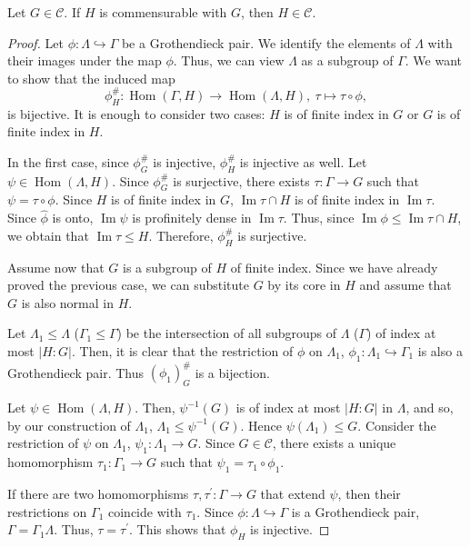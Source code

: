 \documentclass[10pt,a4paper]{amsart}
\DeclareMathOperator{\Hom}{Hom}
\DeclareMathOperator{\im}{Im}
\begin{document}
   \begin{pro}\label{gr1}
Let $G\in \mathcal C$. If $H$ is commensurable with $G$, then $H\in \mathcal C$.
\end{pro}

\begin{proof}
Let  $\phi:\Lambda \hookrightarrow \Gamma$ be a Grothendieck pair. We identify the elements of $\Lambda$ with their images under the map $\phi$. Thus, we can view $\Lambda$ as a subgroup of $\Gamma$.
 We want to show that the induced map 
$$ \phi^{\#}_H:\Hom (\Gamma, H)\to \Hom (\Lambda, H), \ \tau\mapsto \tau\circ \phi,$$  is bijective. It is enough to consider two cases: $H$ is of finite index in $G$ or $G$ is of finite index in $H$.

In the first case, since $\phi_G^{\#}$ is injective,  $\phi_H^{\#}$ is injective as well. Let $\psi\in \Hom (\Lambda, H)$. Since $\phi_G^{\#}$ is surjective, there exists $\tau: \Gamma\to G$ such that $\psi=\tau\circ \phi$. Since $H$ is of finite index in $G$, $\im \tau \cap H$ is of finite index in $\im \tau$. Since $\widehat \phi$ is onto, $\im \psi$ is profinitely dense in $\im \tau$. Thus, since $\im \phi\le \im \tau \cap H$,  we obtain that
$\im \tau\le H$. Therefore, $\phi_H^{\#}$ is surjective.

Assume now that $G$ is a subgroup of $H$ of finite index. Since we have already proved the previous case, we can substitute $G$ by its core in $H$ and  assume that $G$ is also normal in $H$.

Let $\Lambda_1\le \Lambda $ ($\Gamma_1\le \Gamma$) be the intersection of all subgroups of $\Lambda$ ($\Gamma$) of index at most $|H:G|$. Then, it is clear that the restriction of $\phi$ on $\Lambda_1$, $\phi_1:\Lambda_1 \hookrightarrow \Gamma_1$ is also a Grothendieck pair. Thus $(\phi_1)_G^{\#}$ is a bijection. 

Let $\psi\in \Hom(\Lambda, H)$. Then, $\psi^{-1}(G)$ is of index at most $|H:G|$ in $\Lambda$, and so,   by our construction of $\Lambda_1$, $\Lambda_1\le \psi^{-1}(G)$. Hence $\psi(\Lambda_1)\le G$.  Consider the restriction of $\psi$ on $\Lambda_1$, $\psi_1:\Lambda_1 \to  G$.  Since $G\in \mathcal C$, there exists a unique homomorphism $\tau_1:\Gamma_1\to G$ such that $\psi_1=\tau_1\circ \phi_1$.  

If there are two homomorphisms $\tau, \tau^\prime: \Gamma\to G$ that extend $\psi$, then their restrictions on $\Gamma_1$ coincide with $\tau_1$. Since $\phi:\Lambda \hookrightarrow \Gamma$ is a Grothendieck pair, $\Gamma=\Gamma_1\Lambda$.  Thus,  $\tau=\tau^\prime$. This shows that $\phi_H$ is injective.


\end{proof}
\end{document}
